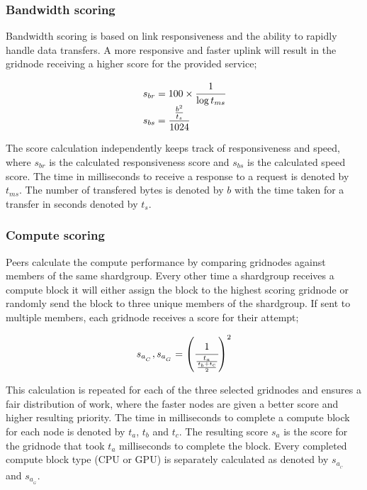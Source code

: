 \documentclass[10pt,a4paper,final]{article}
\begin{document}
\subsubsection{Bandwidth scoring}
Bandwidth scoring is based on link responsiveness and the ability to rapidly handle data transfers. A more responsive and faster uplink will result in the \gls{gridnode} receiving a higher score for the provided service;

\[
	\begin{array}{l}
	s_{br} = 100 \times \cfrac{1}{\log t_{ms}}\\
	s_{bs} = \cfrac{\frac{b^2}{t_s}}{1024}
	\end{array}
\]

\medskip
\noindent The score calculation independently keeps track of responsiveness and speed, where $s_{br}$ is the calculated responsiveness score and $s_{bs}$ is the calculated speed score. The time in milliseconds to receive a response to a request is denoted by $t_{ms}$. The number of transfered bytes is denoted by $b$ with the time taken for a transfer in seconds denoted by $t_s$.

\subsubsection{Compute scoring}
Peers calculate the compute performance by comparing \glspl{gridnode} against members of the same \gls{shardgroup}. Every other time a \gls{shardgroup} receives a compute block it will either assign the block to the highest scoring \gls{gridnode} or randomly send the block to three unique members of the \gls{shardgroup}. If sent to multiple members, each \gls{gridnode} receives a score for their attempt;

\[
	\begin{array}{l}
	s_{a_{_C}}, s_{a_{_G}} = \left( \cfrac{1}{\frac{t_a}{\frac{t_b + t_c}{2}}} \right) ^2\\
	\end{array}	
\]

\noindent This calculation is repeated for each of the three selected \glspl{gridnode} and ensures a fair distribution of work, where the faster nodes are given a better score and higher resulting priority. The time in milliseconds to complete a compute block for each node is denoted by $t_{a}$, $t_{b}$ and $t_{c}$. The resulting score $s_{a}$ is the score for the \gls{gridnode} that took $t_{a}$ milliseconds to complete the block. Every completed compute block type (CPU or GPU) is separately calculated as denoted by $s_{a_{_C}}$ and $s_{a_{_G}}$.
\end{document}
